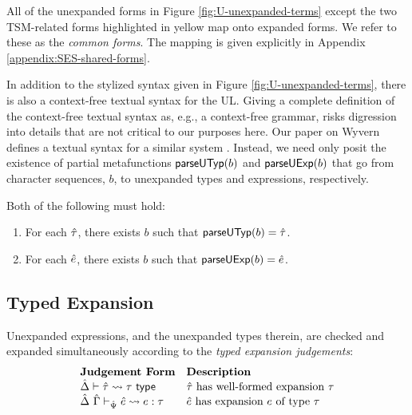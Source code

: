 All of the unexpanded forms in Figure \ref{fig:U-unexpanded-terms} except the two TSM-related forms highlighted in yellow map onto expanded forms. We refer to these as the \emph{common forms}. The mapping is given explicitly in Appendix \ref{appendix:SES-shared-forms}.



In addition to the stylized syntax given in Figure \ref{fig:U-unexpanded-terms}, there is also a context-free textual syntax for the UL. 
Giving a complete definition of the context-free textual syntax as, e.g., a context-free grammar, risks digression into details that are not critical to our purposes here. Our paper on Wyvern defines a textual syntax for a similar system \cite{TSLs}. Instead, we need only posit the existence of partial metafunctions $\mathsf{parseUTyp}(b)$ and $\mathsf{parseUExp}(b)$  that go from character sequences, $b$, to unexpanded types and expressions, respectively. 
\begingroup
\def\thetheorem{\ref{condition:textual-representability-SES}}
\begin{condition} Both of the following must hold:
\begin{enumerate}
\item For each ${\hat\tau}$, there exists $b$ such that $\mathsf{parseUTyp}(b)={\hat\tau}$. 
\item For each ${\hat e}$, there exists $b$ such that $\mathsf{parseUExp}(b)={\hat e}$.
\end{enumerate}
\end{condition}
\endgroup

\subsection{Typed Expansion}\label{sec:typed-expansion-U}
Unexpanded expressions, and the unexpanded types therein, are checked and expanded simultaneously according to the \emph{typed expansion judgements}:
\[\begin{array}{ll}
\textbf{Judgement Form} & \textbf{Description}\\
\hat{\Delta} \vdash {\hat\tau} \leadsto \tau~\mathsf{type} & \text{${\hat\tau}$ has well-formed expansion $\tau$}\\
\hat{\Delta}~\hat{\Gamma} \vdash_{\hat{\Psi}} {\hat e} \leadsto e : \tau & \text{${\hat e}$ has expansion $e$ of type $\tau$}\end{array}\]

